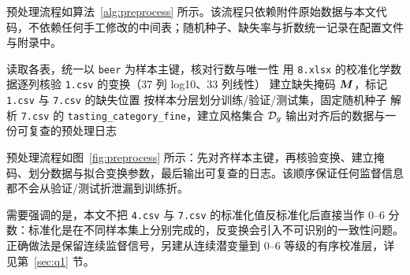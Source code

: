 预处理流程如算法~\ref{alg:preprocess} 所示。该流程只依赖附件原始数据与本文代码，不依赖任何手工修改的中间表；随机种子、缺失率与折数统一记录在配置文件与附录中。

\begin{algorithm}[htbp]
  \small
  \caption{多源数据对齐与预处理}
  \label{alg:preprocess}
  读取各表，统一以 \texttt{beer} 为样本主键，核对行数与唯一性\;
  用 \texttt{8.xlsx} 的校准化学数据逐列核验 \texttt{1.csv} 的变换（37 列 log10、33 列线性）\;
  建立缺失掩码 $\bm{M}$，标记 \texttt{1.csv} 与 \texttt{7.csv} 的缺失位置\;
  按样本分层划分训练/验证/测试集，固定随机种子\;
  解析 \texttt{7.csv} 的 \texttt{tasting\_category\_fine}，建立风格集合 $\mathcal{D}_g$\;
  输出对齐后的数据与一份可复查的预处理日志\;
\end{algorithm}


预处理流程如图~\ref{fig:preprocess} 所示：先对齐样本主键，再核验变换、建立掩码、划分数据与拟合变换参数，最后输出可复查的日志。该顺序保证任何监督信息都不会从验证/测试折泄漏到训练折。

需要强调的是，本文不把 \texttt{4.csv} 与 \texttt{7.csv} 的标准化值反标准化后直接当作 0--6 分数：标准化是在不同样本集上分别完成的，反变换会引入不可识别的一致性问题。正确做法是保留连续监督信号，另建从连续潜变量到 0--6 等级的有序校准层，详见第~\ref{sec:q1} 节。
